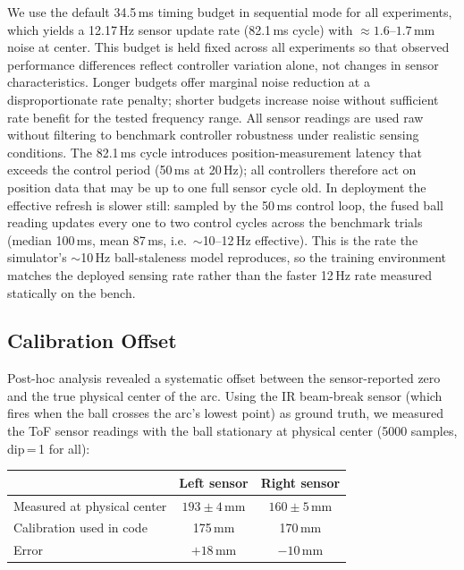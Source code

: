 We use the default 34.5\,ms timing budget in sequential mode for all
experiments, which yields a 12.17\,Hz sensor update rate (82.1\,ms cycle)
with ${\approx}1.6$--$1.7$\,mm noise at center. This budget is held fixed across
all experiments so that observed performance differences
reflect controller variation alone, not changes in sensor characteristics.
Longer budgets offer marginal noise reduction at a disproportionate rate
penalty; shorter budgets increase noise without sufficient rate benefit for
the tested frequency range. All sensor readings are used raw without
filtering to benchmark controller robustness under realistic sensing
conditions. The 82.1\,ms cycle introduces position-measurement latency that
exceeds the control period (50\,ms at 20\,Hz); all
controllers therefore act on position data that may be up to one full
sensor cycle old. In deployment the effective refresh is slower still:
sampled by the 50\,ms control loop, the fused ball reading updates every
one to two control cycles across the benchmark trials (median 100\,ms,
mean 87\,ms, i.e.\ ${\sim}$10--12\,Hz effective). This is the rate the
simulator's ${\sim}$10\,Hz ball-staleness model reproduces, so the
training environment matches the deployed sensing rate rather than the
faster 12\,Hz rate measured statically on the bench.

\subsection{Calibration Offset}
\label{appendix:sensor_offset}

Post-hoc analysis revealed a systematic offset between the sensor-reported
zero and the true physical center of the arc.  Using the IR beam-break
sensor (which fires when the ball crosses the arc's lowest point) as
ground truth, we measured the ToF sensor readings with the ball
stationary at physical center (5000 samples, dip\,=\,1 for all):

\begin{center}
\begin{tabular}{lcc}
\toprule
 & Left sensor & Right sensor \\
\midrule
Measured at physical center & $193 \pm 4$\,mm & $160 \pm 5$\,mm \\
Calibration used in code    & 175\,mm         & 170\,mm         \\
Error                       & $+18$\,mm       & $-10$\,mm       \\
\bottomrule
\end{tabular}
\end{center}

